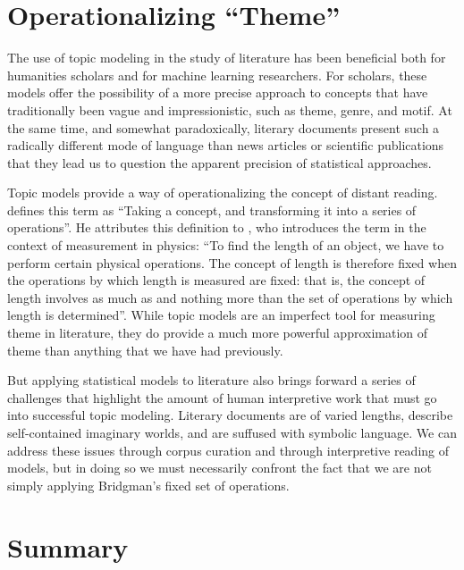 {\section{Operationalizing ``Theme''}

The use of topic modeling in the study of literature has been beneficial both for humanities scholars and for machine learning researchers.
For scholars, these models offer the possibility of a more precise approach to concepts that have traditionally been vague and impressionistic, such as theme, genre, and motif.
At the same time, and somewhat paradoxically, literary documents present such a radically different mode of language than news articles or scientific publications that they lead us to question the apparent precision of statistical approaches.

Topic models provide a way of operationalizing the concept of distant reading.
\citet{moretti2013operationalizing} defines this term as ``Taking a concept, and transforming it into a series of operations''.
He attributes this definition to \citet{bridgman1927logic},  who introduces the term in the context of measurement in physics: ``To find the length of an object, we have to perform certain physical operations. The concept of length is therefore fixed when the operations by which length is measured are fixed: that is, the concept of length involves as much as and nothing more than the set of operations by which length is determined''.
While topic models are an imperfect tool for measuring theme in literature, they do provide a much more powerful approximation of theme than anything that we have had previously.

But applying statistical models to literature also brings forward a series of challenges that highlight the amount of human interpretive work that must go into successful topic modeling.
Literary documents are of varied lengths, describe self-contained imaginary worlds, and are suffused with symbolic language.
We can address these issues through corpus curation and through interpretive reading of models, but in doing so we must necessarily confront the fact that we are not simply applying Bridgman's fixed set of operations.

\section{Summary}

}
